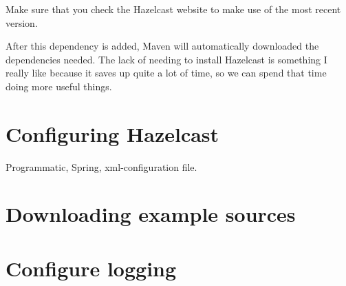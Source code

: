 Make sure that you check the Hazelcast website to make use of the most recent version. 

After this dependency is added, Maven will automatically downloaded the dependencies needed. The lack of needing to install Hazelcast is something I really like because it saves up quite a lot of time, so we can spend that time doing more useful things.

\section{Configuring Hazelcast}

Programmatic, Spring, xml-configuration file.

\section{Downloading example sources}

\section{Configure logging}

